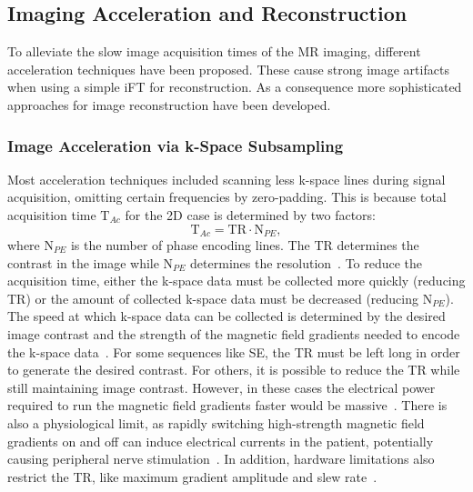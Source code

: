 \subsection{Imaging Acceleration and Reconstruction} \label{SubSec:ImagingAccelerationReconstruction}
To alleviate the slow image acquisition times of the MR imaging, different acceleration techniques have been proposed. These cause strong image artifacts when using a simple iFT for reconstruction. As a consequence more sophisticated approaches for image reconstruction have been developed.

\subsubsection{Image Acceleration via k-Space Subsampling} \label{SubSubSec:AccelerationSubsampling}
Most acceleration techniques included scanning less k-space lines during signal acquisition, omitting certain frequencies by zero-padding. This is because total acquisition time $\text{T}_{Ac}$ for the 2D case is determined by two factors:
\begin{equation}
	\text{T}_{Ac} = \text{TR} \cdot \text{N}_{PE},
\end{equation}
where $\text{N}_{PE}$ is the number of phase encoding lines. The TR determines the contrast in the image while $\text{N}_{PE}$ determines the resolution~\cite{ParallelMRI}. To reduce the acquisition time, either the k-space data must be collected more quickly (reducing TR) or the amount of collected k-space data must be decreased (reducing $\text{N}_{PE}$). The speed at which k-space data can be collected is determined by the desired image contrast and the strength of the magnetic field gradients needed to encode the k-space data~\cite{ParallelMRI}. For some sequences like SE, the TR must be left long in order to generate the desired contrast. For others, it is possible to reduce the TR while still maintaining image contrast. However, in these cases the electrical power required to run the magnetic field gradients faster would be massive~\cite{ParallelMRI}. There is also a physiological limit, as rapidly switching high-strength magnetic field gradients on and off can induce electrical currents in the patient, potentially causing peripheral nerve stimulation~\cite{Cohen1990,Ham1997}. In addition, hardware limitations also restrict the TR, like maximum gradient amplitude and slew rate~\cite{AdvancesPI}. \\
